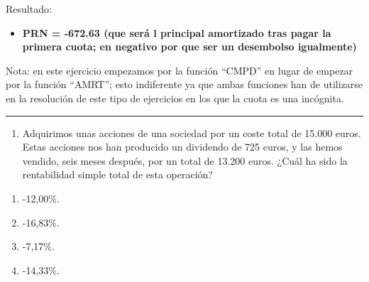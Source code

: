 \documentclass[
  letterpaper,
  DIV=11,
  numbers=noendperiod]{scrreprt}
\providecommand{\tightlist}{%
  \setlength{\itemsep}{0pt}\setlength{\parskip}{0pt}}\usepackage{longtable,booktabs,array}
\begin{document}
\begin{tcolorbox}[enhanced jigsaw, left=2mm, opacityback=0, colback=white, breakable, arc=.35mm, bottomrule=.15mm, rightrule=.15mm, toprule=.15mm, leftrule=.75mm, colframe=quarto-callout-tip-color-frame]
\begin{minipage}[t]{\textwidth - 5.5mm}
Resultado:

\begin{itemize}
\tightlist
\item
  \textbf{PRN = -672.63 (que será l principal amortizado tras pagar la
  primera cuota; en negativo por que ser un desembolso igualmente)}
\end{itemize}

Nota: en este ejercicio empezamos por la función ``CMPD'' en lugar de
empezar por la función ``AMRT''; esto indiferente ya que ambas funciones
han de utilizarse en la resolución de este tipo de ejercicios en los que
la cuota es una incógnita.

\end{minipage}%
\end{tcolorbox}

\begin{center}\rule{0.5\linewidth}{0.5pt}\end{center}

\begin{enumerate}
\def\labelenumi{\arabic{enumi}.}
\setcounter{enumi}{59}
\tightlist
\item
  Adquirimos unas acciones de una sociedad por un coste total de 15.000
  euros. Estas acciones nos han producido un dividendo de 725 euros, y
  las hemos vendido, seis meses después, por un total de 13.200 euros.
  ¿Cuál ha sido la rentabilidad simple total de esta operación?
\end{enumerate}

\begin{enumerate}
\def\labelenumi{\alph{enumi})}
\item
  -12,00\%.
\item
  -16,83\%.
\item
  -7,17\%.
\item
  -14,33\%.
\end{enumerate}
\end{document}
